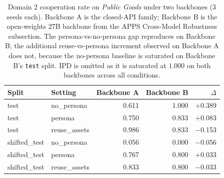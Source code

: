 \begin{table}[t]
\centering
\small
\begin{tabular}{llrrr}
\toprule
Split & Setting & Backbone A & Backbone B & $\Delta$ \\
\midrule
test & no\_persona & 0.611 & 1.000 & $+$0.389 \\
test & persona & 0.750 & 0.833 & $+$0.083 \\
test & reuse\_assets & 0.986 & 0.833 & $-$0.153 \\
shifted\_test & no\_persona & 0.056 & 0.000 & $-$0.056 \\
shifted\_test & persona & 0.767 & 0.800 & $+$0.033 \\
shifted\_test & reuse\_assets & 0.833 & 0.800 & $-$0.033 \\
\bottomrule
\end{tabular}
\caption{Domain 2 cooperation rate on \emph{Public Goods} under two backbones (3 seeds each). Backbone A is the closed-API family; Backbone B is the open-weights 27B backbone from the APPS Cross-Model Robustness subsection. The persona-vs-no-persona gap reproduces on Backbone B; the additional reuse-vs-persona increment observed on Backbone A does not, because the no-persona baseline is saturated on Backbone B's \texttt{test} split. IPD is omitted as it is saturated at $1.000$ on both backbones across all conditions.}
\label{tab:games-cross-model}
\end{table}
